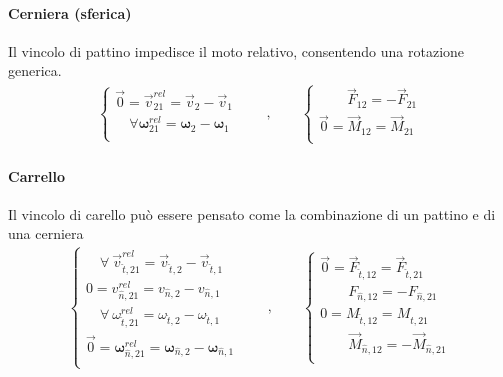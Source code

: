 \documentclass[letterpaper,10pt,italian]{jupyterBook}
\begin{document}
\paragraph{Cerniera (sferica)}
\label{\detokenize{ch/mechanics/actions-examples:cerniera-sferica}}
\sphinxAtStartPar
Il vincolo di pattino impedisce il moto relativo, consentendo una rotazione generica.
\begin{equation*}
\begin{split}
\begin{cases}
  \vec{0} = \vec{v}^{rel}_{21}     = \vec{v}_{2}     - \vec{v}_{1} \\
  \quad \forall \symbf{\omega}^{rel}_{21} = \symbf{\omega}_{2} - \symbf{\omega}_{1} \\
\end{cases}
\qquad , \qquad
\begin{cases}
  \qquad \vec{F}_{12} = - \vec{F}_{21} \\
  \vec{0} =  \vec{M}_{12} = \vec{M}_{21} \\
\end{cases}
\end{split}
\end{equation*}

\paragraph{Carrello}
\label{\detokenize{ch/mechanics/actions-examples:carrello}}
\sphinxAtStartPar
Il vincolo di carello può essere pensato come la combinazione di un pattino e di una cerniera
\begin{equation*}
\begin{split}
\begin{cases}
  \quad \forall \ \vec{v}^{rel}_{\hat{t},21}     = \vec{v}_{\hat{t},2}     - \vec{v}_{\hat{t},1} \\
          0  = v^{rel}_{\hat{n},21}     = v_{\hat{n},2}     - v_{\hat{n},1} \\
  \quad \forall \ \omega^{rel}_{\hat{t},21} = \omega_{\hat{t},2} - \omega_{\hat{t},1} \\
  \vec{0} = \symbf{\omega}^{rel}_{\hat{n},21} = \symbf{\omega}_{\hat{n},2} - \symbf{\omega}_{\hat{n},1} \\
\end{cases}
\qquad , \qquad
\begin{cases}
  \vec{0} = \vec{F}_{\hat{t},12} = \vec{F}_{\hat{t},21} \\
  \qquad F_{\hat{n},12} = - F_{\hat{n},21} \\
  0 =  M_{\hat{t},12} = M_{\hat{t},21} \\
  \qquad \vec{M}_{\hat{n},12} = - \vec{M}_{\hat{n},21} \\
\end{cases}
\end{split}
\end{equation*}
\end{document}
